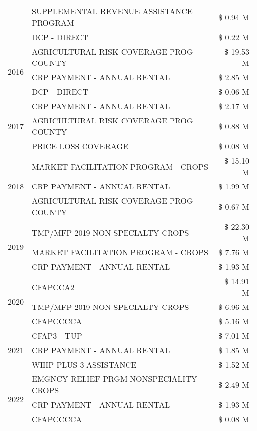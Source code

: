 \begin{tabular}{llr}
 & SUPPLEMENTAL REVENUE ASSISTANCE PROGRAM & \$ 0.94 M \\
 & DCP - DIRECT & \$ 0.22 M \\
\cline{1-3}
\multirow[t]{3}{*}{2016} & AGRICULTURAL RISK COVERAGE PROG - COUNTY & \$ 19.53 M \\
 & CRP PAYMENT - ANNUAL RENTAL & \$ 2.85 M \\
 & DCP - DIRECT & \$ 0.06 M \\
\cline{1-3}
\multirow[t]{3}{*}{2017} & CRP PAYMENT - ANNUAL RENTAL & \$ 2.17 M \\
 & AGRICULTURAL RISK COVERAGE PROG - COUNTY & \$ 0.88 M \\
 & PRICE LOSS COVERAGE & \$ 0.08 M \\
\cline{1-3}
\multirow[t]{3}{*}{2018} & MARKET FACILITATION PROGRAM - CROPS & \$ 15.10 M \\
 & CRP PAYMENT - ANNUAL RENTAL & \$ 1.99 M \\
 & AGRICULTURAL RISK COVERAGE PROG - COUNTY & \$ 0.67 M \\
\cline{1-3}
\multirow[t]{3}{*}{2019} & TMP/MFP 2019 NON SPECIALTY CROPS & \$ 22.30 M \\
 & MARKET FACILITATION PROGRAM - CROPS & \$ 7.76 M \\
 & CRP PAYMENT - ANNUAL RENTAL & \$ 1.93 M \\
\cline{1-3}
\multirow[t]{3}{*}{2020} & CFAPCCA2 & \$ 14.91 M \\
 & TMP/MFP 2019 NON SPECIALTY CROPS & \$ 6.96 M \\
 & CFAPCCCCA & \$ 5.16 M \\
\cline{1-3}
\multirow[t]{3}{*}{2021} & CFAP3 - TUP & \$ 7.01 M \\
 & CRP PAYMENT - ANNUAL RENTAL & \$ 1.85 M \\
 & WHIP PLUS 3 ASSISTANCE & \$ 1.52 M \\
\cline{1-3}
\multirow[t]{3}{*}{2022} & EMGNCY RELIEF PRGM-NONSPECIALITY CROPS & \$ 2.49 M \\
 & CRP PAYMENT - ANNUAL RENTAL & \$ 1.93 M \\
 & CFAPCCCCA & \$ 0.08 M \\
\cline{1-3}
\bottomrule
\end{tabular}

